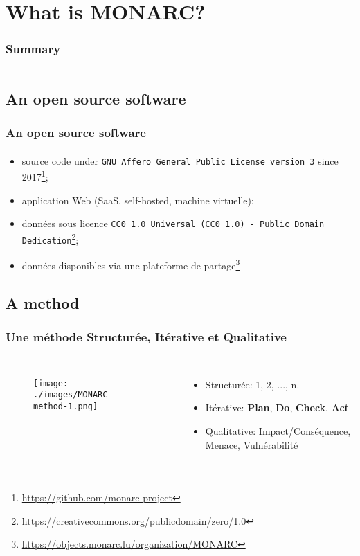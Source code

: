 \documentclass[]{beamer}
\begin{document}
% 
%
\section{What is MONARC?}
\begin{frame}
    \frametitle{Summary}
    \begin{columns}[t]
        \begin{column}{5cm}
            \tableofcontents[sections={1-3}, currentsection, hideothersubsections]
        \end{column}
        \begin{column}{5cm}
            \tableofcontents[sections={4-5}, currentsection, hideothersubsections]
        \end{column}
    \end{columns}
\end{frame}
\subsection{An open source software}
\begin{frame}
\frametitle{An open source software}
\framesubtitle{}
    \begin{itemize}
        \item source code under \texttt{GNU Affero General Public License version 3} since 2017\footnote{\url{https://github.com/monarc-project}};
        \item application Web (SaaS, self-hosted, machine virtuelle);
        \item données sous licence \texttt{CC0 1.0 Universal (CC0 1.0) - Public Domain Dedication}\footnote{\url{https://creativecommons.org/publicdomain/zero/1.0}};
        \item données disponibles via une plateforme de partage\footnote{\url{https://objects.monarc.lu/organization/MONARC}}
    \end{itemize}
\end{frame}


\subsection{A method}
\begin{frame}
    \frametitle{Une méthode Structurée, Itérative et Qualitative}
    \framesubtitle{}
    \begin{columns}[t]
        \column{6.0cm}
        \begin{figure}
        \texttt{[image: ./images/MONARC-method-1.png]}
        \end{figure}
        \column{6cm}
        \begin{itemize}
                \item Structurée: 1, 2, ..., n.
                \item Itérative: \textbf{Plan}, \textbf{Do}, \textbf{Check}, \textbf{Act}
                \item Qualitative: Impact/Conséquence, Menace, Vulnérabilité
        \end{itemize}
        \end{columns}
\end{frame}
\end{document}
